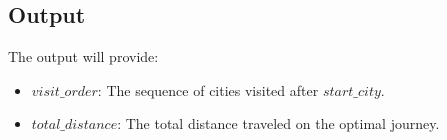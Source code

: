 \documentclass{article}
\begin{document}
\subsection*{Output}
The output will provide:
\begin{itemize}
    \item $visit\_order$: The sequence of cities visited after $start\_city$.
    \item $total\_distance$: The total distance traveled on the optimal journey.
\end{itemize}
\end{document}

